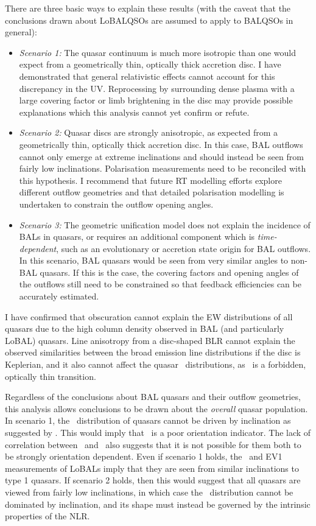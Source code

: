 There are three basic ways to explain these results (with the caveat that the conclusions
drawn about LoBALQSOs are assumed to apply to BALQSOs in general):
\begin{itemize}
	\item {\sl Scenario 1:} The quasar continuum is much more isotropic than one would
	expect from a geometrically thin, optically thick accretion disc.
    I have demonstrated that general relativistic effects cannot account for this discrepancy in the 
    UV. Reprocessing by surrounding dense plasma with a large covering factor or limb brightening 
    in the disc may provide possible explanations which this analysis cannot yet confirm or refute.
    \smallskip
	\item {\sl Scenario 2:} Quasar discs are strongly anisotropic, as expected from a 
	geometrically thin, optically thick accretion disc. In this case, BAL outflows cannot 
	only emerge at extreme inclinations and should instead be seen from fairly low inclinations. 
	Polarisation measurements need to be reconciled with this hypothesis.
	I recommend that future RT modelling efforts explore different outflow 
	geometries and that detailed polarisation modelling is undertaken to constrain the 
	outflow opening angles.
	\smallskip
	\item  {\sl Scenario 3:} The geometric unification model does not explain the incidence of 
	BALs in quasars, or requires an additional component which is {\em time-dependent}, 
	such as an evolutionary or accretion state origin for BAL outflows. In this scenario, 
	BAL quasars would be seen from very similar angles to non-BAL quasars. If this is the case,
	the covering factors and opening angles of the outflows still need to be constrained so
	that feedback efficiencies can be accurately estimated.
\end{itemize}
I have confirmed that obscuration cannot explain the EW distributions of all quasars
due to the high column density observed in BAL (and particularly LoBAL) quasars. 
Line anisotropy from a disc-shaped BLR cannot explain the observed similarities between the broad emission
line distributions if the disc is Keplerian, and it also cannot affect the 
quasar \ewo\ distributions, as \oiiifull\ is a forbidden, optically thin transition.

Regardless of the conclusions about BAL quasars and their outflow geometries,
this analysis allows conclusions to be drawn about the {\em overall} 
quasar population. In scenario 1, the \ewo\ distribution of quasars cannot
be driven by inclination as suggested by \citep{risaliti2011}. This would
imply that \ewo\ is a poor orientation indicator. The lack of correlation 
between \ewo\ and \fwh\ also suggests that it is not possible for them both
to be strongly orientation dependent. Even if scenario 1 holds, the \fwh\ and EV1
measurements of LoBALs imply that they are seen from similar inclinations to type 1 quasars. 
If scenario 2 holds, then this would suggest that all quasars are viewed from fairly low inclinations,
in which case the \ewo\ distribution cannot be dominated by inclination, and its shape 
must instead be governed by the intrinsic properties of the NLR.

